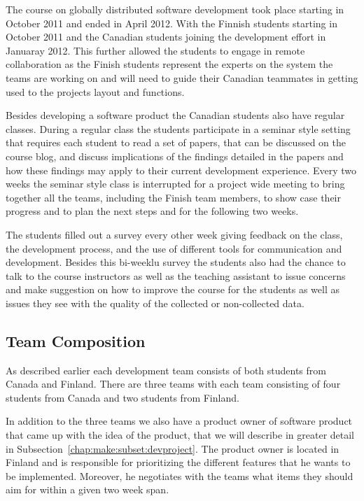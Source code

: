 The course on globally distributed software development took place starting in October 2011 and ended in April 2012.
With the Finnish students starting in October 2011 and the Canadian students joining the development effort in Januaray 2012.
This further allowed the students to engage in remote collaboration as the Finish students represent the experts on the system the teams are working on and will need to guide their Canadian teammates in getting used to the projects layout and functions.

Besides developing a software product the Canadian students also have regular classes.
During a regular class the students participate in a seminar style setting that requires each student to read a set of papers, that can be discussed on the course blog, and discuss implications of the findings detailed in the papers and how these findings may apply to their current development experience.
Every two weeks the seminar style class is interrupted for a project wide meeting to bring together all the teams, including the Finish team members, to show case their progress and to plan the next steps and for the following two weeks.

The students filled out a survey every other week giving feedback on the class, the development process, and the use of different tools for communication and development.
Besides this bi-weeklu survey the students also had the chance to talk to the course instructors as well as the teaching assistant to issue concerns and make suggestion on how to improve the course for the students as well as issues they see with the quality of the collected or non-collected data.

\subsection{Team Composition}
As described earlier each development team consists of both students from Canada and Finland.
There are three teams with each team consisting of four students from Canada and two students from Finland.

In addition to the three teams we also have a product owner of software product that came up with the idea of the product, that we will describe in greater detail in Subsection~\ref{chap:make:subset:devproject}.
The product owner is located in Finland and is responsible for prioritizing the different features that he wants to be implemented.
Moreover, he negotiates with the teams what items they should aim for within a given two week span. 

